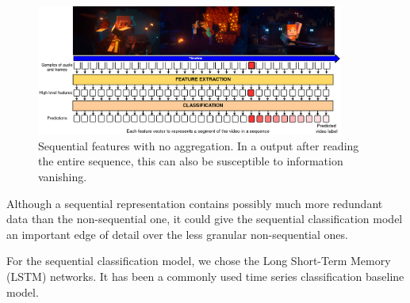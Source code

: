 \begin{figure}[!ht]
    \centering
    \includegraphics[width=0.9\textwidth]{img/model-sequence.png}
    \caption{Sequential features with no aggregation. In a output after reading the entire sequence, this can also be susceptible to information vanishing.}
    \label{fig:model-sequence}
    \vspace{-1em}
\end{figure}
Although a sequential representation contains possibly much more redundant data than the non-sequential one, it could give the sequential classification model an important edge of detail over the less granular non-sequential ones.

For the sequential classification model, we chose the Long Short-Term Memory (LSTM)\cite{hochreiter1997long} networks.
It has been a commonly used time series classification baseline model. %

